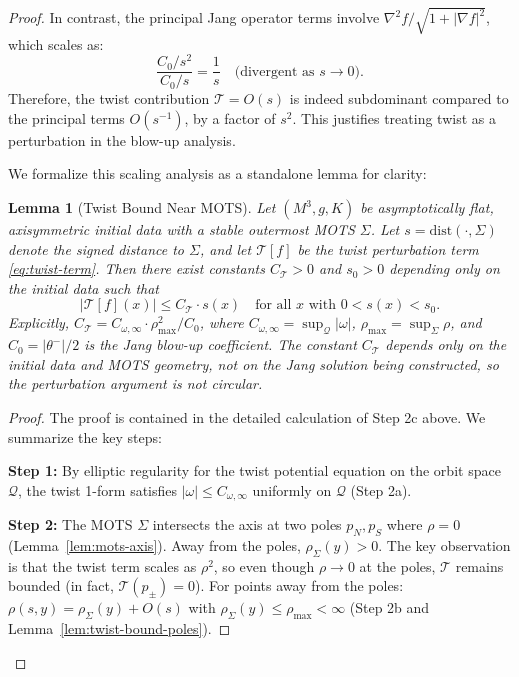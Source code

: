 \documentclass[12pt]{article}
\theoremstyle{plain}
\newtheorem{lemma}[theorem]{Lemma}
\theoremstyle{definition}
\theoremstyle{remark}
\begin{document}
\begin{proof}
In contrast, the principal Jang operator terms involve $\nabla^2 f / \sqrt{1 + |\nabla f|^2}$, which scales as:
\[
\frac{C_0/s^2}{C_0/s} = \frac{1}{s} \quad \text{(divergent as } s \to 0).
\]
Therefore, the twist contribution $\mathcal{T} = O(s)$ is indeed subdominant compared to the principal terms $O(s^{-1})$, by a factor of $s^2$. This justifies treating twist as a perturbation in the blow-up analysis.

We formalize this scaling analysis as a standalone lemma for clarity:

\begin{lemma}[Twist Bound Near MOTS]\label{lem:twist-bound}
Let $(M^3, g, K)$ be asymptotically flat, axisymmetric initial data with a stable outermost MOTS $\Sigma$. Let $s = \mathrm{dist}(\cdot, \Sigma)$ denote the signed distance to $\Sigma$, and let $\mathcal{T}[f]$ be the twist perturbation term \eqref{eq:twist-term}. Then there exist constants $C_\mathcal{T} > 0$ and $s_0 > 0$ depending only on the initial data such that
\begin{equation}\label{eq:twist-bound-explicit}
|\mathcal{T}[f](x)| \leq C_\mathcal{T} \cdot s(x) \quad \text{for all } x \text{ with } 0 < s(x) < s_0.
\end{equation}
Explicitly, $C_\mathcal{T} = C_{\omega,\infty} \cdot \rho_{\max}^2 / C_0$, where $C_{\omega,\infty} = \sup_{\mathcal{Q}} |\omega|$, $\rho_{\max} = \sup_\Sigma \rho$, and $C_0 = |\theta^-|/2$ is the Jang blow-up coefficient. The constant $C_\mathcal{T}$ depends only on the initial data and MOTS geometry, not on the Jang solution being constructed, so the perturbation argument is not circular.
\end{lemma}

\begin{proof}
The proof is contained in the detailed calculation of Step 2c above. We summarize the key steps:

\textbf{Step 1:} By elliptic regularity for the twist potential equation on the orbit space $\mathcal{Q}$, the twist 1-form satisfies $|\omega| \leq C_{\omega,\infty}$ uniformly on $\mathcal{Q}$ (Step 2a).

\textbf{Step 2:} The MOTS $\Sigma$ intersects the axis at two poles $p_N, p_S$ where $\rho = 0$ (Lemma~\ref{lem:mots-axis}). Away from the poles, $\rho_\Sigma(y) > 0$. The key observation is that the twist term scales as $\rho^2$, so even though $\rho \to 0$ at the poles, $\mathcal{T}$ remains bounded (in fact, $\mathcal{T}(p_\pm) = 0$). For points away from the poles: $\rho(s, y) = \rho_\Sigma(y) + O(s)$ with $\rho_\Sigma(y) \leq \rho_{\max} < \infty$ (Step 2b and Lemma~\ref{lem:twist-bound-poles}).


\end{proof}
\end{proof}
\end{document}
